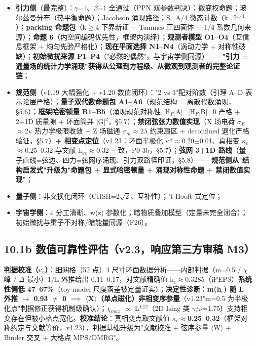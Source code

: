 \documentclass[12pt]{article}
\newcommand{\up}[1]{\ensuremath{^{#1}}}
\newcommand{\down}[1]{\ensuremath{_{#1}}}
\begin{document}
\begin{itemize}
\item \textbf{引力侧}（最完整）：\ensuremath{\gamma}=1、\ensuremath{\beta}=1 全通过（PPN 双参数判决）；微变权命题；玻尔兹曼分布（热平衡命题）；Jacobson 涌现路径；S=A/4 微态计数（k=2\up{1/4}）；\textbf{packing 命题包}（k\ensuremath{\geq}4 下界新证 + Tammes 正四面体 + 1/4 系数几何来源）；\textbf{命题 6}（内空间编码优先性，框架内演绎）；\textbf{观测者模型 O1--O4}（互信息框架 + 均匀先验严格化）；\textbf{现在平面选择 N1--N4}（涡动力学 + 对称性破缺）；\textbf{初始微扰来源 P1--P4}（"必然的偶然"，与宇宙学侧同源）------\textbf{"引力 = 通量场的统计力学涌现"获得从公理到方程级、从微观到观测者的完整论证链}；
\item \textbf{规范侧}（v1.19 大幅强化 + v1.20 数值闭环）："2 vs 3"配对阶数（引理 A--D 表示论层严格）；\textbf{量子双代数命题包 A1--A6}（规范结构 = 离散代数涌现，\S{}5.6）；\textbf{框架哈密顿量 B1--B5}（涌现规范对称性 [H\down{F},A]=[H\down{F},B]=0 严格 + 2+1D 质量隙 + 环面简并 |G|\up{2}，\S{}5.7）；\textbf{禁闭弦张力数值实现}（X 场电荷 \ensuremath{\sigma}\down{E}\ensuremath{\approx}2\ensuremath{\kappa} 热力学极限收敛 + Z 场磁通 \ensuremath{\sigma}\down{m}\ensuremath{\approx}2\ensuremath{\lambda} 约束扇区 + deconfined 退化严格验证，\S{}5.7）\textbf{+ 相变点定位}（v1.23：环面半极化 \ensuremath{\kappa}*\ensuremath{\approx}0.20\ensuremath{\pm}0.01、真相变 \ensuremath{\kappa}\down{c}\ensuremath{\approx}0.25--0.32 与文献 h\down{xc}\ensuremath{\approx}0.32 一致，P0-3b，\S{}5.7）；\textbf{弦网 3+1D 路线}（量子直线=弦边、四力=弦网序涌现、引力双路径印证，\S{}5.8）------\textbf{规范侧从"结构启发式"升级为"命题包 + 显式哈密顿量 + 涌现对称性命题 + 禁闭数值实现"}；
\item \textbf{量子侧}：非交换化闭环（CHSH=2\ensuremath{\sqrt{2}}、互补性）；'t Hooft 式定位；
\item \textbf{宇宙学侧}：\ensuremath{\varepsilon} 分工清晰、w(z) 参数化；暗物质叠加模型（定量未完全闭合）；初始微扰与重子不对称/暗能量同源（F26）。
\end{itemize}

\subsection{10.1b 数值可靠性评估（v2.3，响应第三方审稿 M3）}

\textbf{判据校准（\ensuremath{\kappa}\down{c}）}：细网格（52 点）4 尺寸环面数据分析------内部判据（m=0.5 / \ensuremath{\chi} 峰 / \ensuremath{\Delta} 最小）1/L 外推给出 0.11--0.17，对文献精确值 h\down{c}\ensuremath{\approx}0.3285（iPEPS）\textbf{系统性偏低 47--67\%}（toy-model 尺度落差被定量证实）；\textbf{决定性诊断：m(h\down{c}) 随 L 外推 \ensuremath{\to} 0.93 \ensuremath{\neq} 0 \ensuremath{\implies} \ensuremath{\langle}X\ensuremath{\rangle}（单点磁化）非相变序参量}（v1.23"m=0.5 为半极化点"判据修正获得机制级确认）；\ensuremath{\chi}\down{max} \ensuremath{\propto} L\up{1.12}（2D Ising 类 \ensuremath{\gamma}/\ensuremath{\nu}=1.75）支持相变存在但被小格点宽化。\textbf{校准结论}：真相变点取文献值 \textbf{\ensuremath{\kappa}\down{c}\ensuremath{\approx}0.25--0.32}（框架对称约定与文献等价，v1.23），判据基础升级为"文献校准 + 弦序参量 \ensuremath{\langle}W\ensuremath{\rangle} + Binder 交叉 + 大格点 MPS/DMRG"。
\end{document}
